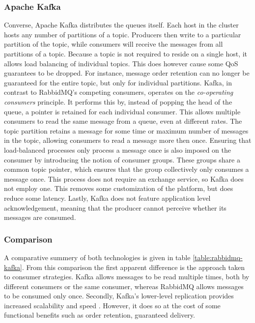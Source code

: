 \subsubsection*{Apache Kafka}
Converse, Apache Kafka \cite{web:kafka} distributes the queues itself. Each host in the cluster hosts any number of partitions of a topic. Producers then write to a particular partition of the topic, while consumers will receive the messages from all partitions of a topic. Because a topic is not required to reside on a single host, it allows load balancing of individual topics. This does however cause some QoS guarantees to be dropped. For instance, message order retention can no longer be guaranteed for the entire topic, but only for individual partitions. Kafka, in contrast to RabbidMQ's competing consumers, operates on the \emph{co-operating consumers} principle. It performs this by, instead of popping the head of the queue, a pointer is retained for each individual consumer. This allows multiple consumers to read the same message from a queue, even at different rates. The topic partition retains a message for some time or maximum number of messages in the topic, allowing consumers to read a message more then once. Ensuring that load-balanced processes only process a message once is also imposed on the consumer by introducing the notion of consumer groups. These groups share a common topic pointer, which ensures that the group collectively only consumes a message once. This process does not require an exchange service, so Kafka does not employ one. This removes some customization of the platform, but does reduce some latency. Lastly, Kafka does not feature application level acknowledgement, meaning that the producer cannot perceive whether its messages are consumed.

\subsubsection*{Comparison}

A comparative summery of both technologies is given in table \ref{table:rabbidmq-kafka}. From this comparison the first apparent difference is the approach taken to consumer strategies. Kafka allows messages to be read multiple times, both by different consumers or the same consumer, whereas RabbidMQ allows messages to be consumed only once. Secondly, Kafka's lower-level replication provides increased scalability and speed \cite{kafka_vs_rabbitmq}. However, it does so at the cost of some functional benefits such as order retention, guaranteed delivery.

